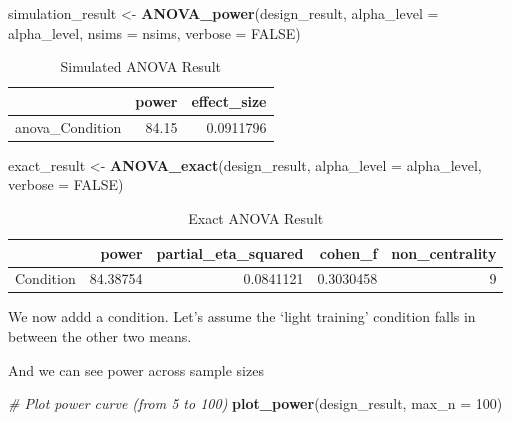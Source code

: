 \documentclass[]{book}
\newenvironment{Shaded}{\begin{snugshade}}{\end{snugshade}}
\newcommand{\CommentTok}[1]{\textcolor[rgb]{0.56,0.35,0.01}{\textit{#1}}}
\newcommand{\DataTypeTok}[1]{\textcolor[rgb]{0.13,0.29,0.53}{#1}}
\newcommand{\DecValTok}[1]{\textcolor[rgb]{0.00,0.00,0.81}{#1}}
\newcommand{\KeywordTok}[1]{\textcolor[rgb]{0.13,0.29,0.53}{\textbf{#1}}}
\newcommand{\NormalTok}[1]{#1}
\newcommand{\OtherTok}[1]{\textcolor[rgb]{0.56,0.35,0.01}{#1}}
\newcommand{\StringTok}[1]{\textcolor[rgb]{0.31,0.60,0.02}{#1}}
\begin{document}
\begin{Shaded}
\begin{Highlighting}[]
\NormalTok{simulation_result <-}\StringTok{ }\KeywordTok{ANOVA_power}\NormalTok{(design_result, }
                                 \DataTypeTok{alpha_level =}\NormalTok{ alpha_level, }
                                 \DataTypeTok{nsims =}\NormalTok{ nsims,}
                                 \DataTypeTok{verbose =} \OtherTok{FALSE}\NormalTok{)}
\end{Highlighting}
\end{Shaded}

\begin{table}[!h]

\caption{\label{tab:unnamed-chunk-275}Simulated ANOVA Result}
\centering
\begin{tabular}{l|r|r}
\hline
  & power & effect\_size\\
\hline
anova\_Condition & 84.15 & 0.0911796\\
\hline
\end{tabular}
\end{table}

\begin{Shaded}
\begin{Highlighting}[]
\NormalTok{exact_result <-}\StringTok{ }\KeywordTok{ANOVA_exact}\NormalTok{(design_result,}
                            \DataTypeTok{alpha_level =}\NormalTok{ alpha_level,}
                            \DataTypeTok{verbose =} \OtherTok{FALSE}\NormalTok{)}
\end{Highlighting}
\end{Shaded}

\begin{table}[!h]

\caption{\label{tab:unnamed-chunk-277}Exact ANOVA Result}
\centering
\begin{tabular}{l|r|r|r|r}
\hline
  & power & partial\_eta\_squared & cohen\_f & non\_centrality\\
\hline
Condition & 84.38754 & 0.0841121 & 0.3030458 & 9\\
\hline
\end{tabular}
\end{table}

We now addd a condition. Let's assume the `light training' condition falls in between the other two means.

And we can see power across sample sizes

\begin{Shaded}
\begin{Highlighting}[]
\CommentTok{# Plot power curve (from 5 to 100)}
\KeywordTok{plot_power}\NormalTok{(design_result, }\DataTypeTok{max_n =} \DecValTok{100}\NormalTok{)}
\end{Highlighting}
\end{Shaded}
\end{document}
